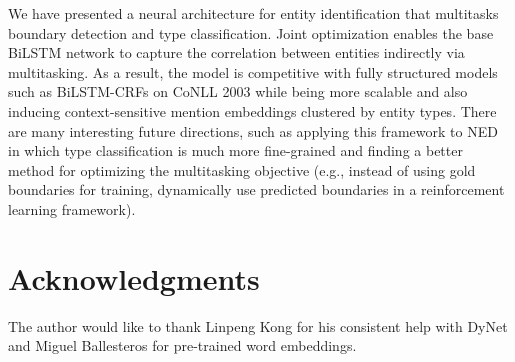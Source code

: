 \documentclass[11pt,letterpaper,UTF8]{article}
\begin{document}
We have presented a neural architecture for entity identification that multitasks boundary detection and type classification.
Joint optimization enables the base BiLSTM network to capture the correlation between entities indirectly via multitasking.
As a result, the model is competitive with fully structured models such as BiLSTM-CRFs on CoNLL 2003
while being more scalable and also inducing context-sensitive mention embeddings clustered by entity types.
There are many interesting future directions, such as applying this framework to NED in which type classification is much more fine-grained
and finding a better method for optimizing the multitasking objective
(e.g., instead of using gold boundaries for training, dynamically use predicted boundaries in a reinforcement learning framework).


\section*{Acknowledgments}
The author would like to thank Linpeng Kong for his consistent help with DyNet
and Miguel Ballesteros for pre-trained word embeddings.



\end{document}
